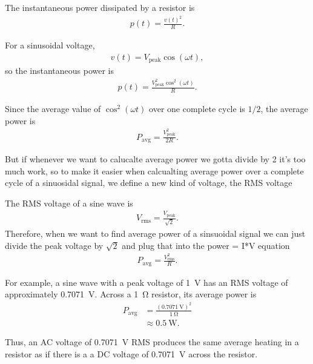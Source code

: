 \documentclass{article}
\begin{document}
    The instantaneous power dissipated by a resistor is
    \begin{align*}
        p(t) = \frac{v(t)^2}{R}.
    \end{align*}

    For a sinusoidal voltage,
    \begin{align*}
        v(t) = V_{\mathrm{peak}}\cos(\omega t),
    \end{align*}
    so the instantaneous power is
    \begin{align*}
        p(t) = \frac{V_{\mathrm{peak}}^2\cos^2(\omega t)}{R}.
    \end{align*}

    Since the average value of $\cos^2(\omega t)$ over one complete cycle
    is $1/2$, the average power is
    \begin{align*}
        P_{\mathrm{avg}} = \frac{V_{\mathrm{peak}}^2}{2R}.
    \end{align*}

    But if whenever we want to calucalte average power we gotta divide by 2 it's too much work, so to make it easier when calcualting average power over a complete cycle of a sinuosidal signal, we define a new kind of voltage, the RMS voltage

    The RMS voltage of a sine wave is
    \begin{align*}
        V_{\mathrm{rms}} = \frac{V_{\mathrm{peak}}}{\sqrt{2}}.
    \end{align*}
    Therefore, when we want to find average power of a sinsuoidal signal we can just divide the peak voltage by $\sqrt{2}$ and plug that into the power = I*V equation
    \begin{align*}
        P_{\mathrm{avg}} = \frac{V_{\mathrm{rms}}^2}{R}.
    \end{align*}

    For example, a sine wave with a peak voltage of \SI{1}{\volt} has an
    RMS voltage of approximately \SI{0.7071}{\volt}. Across a
    \SI{1}{\ohm} resistor, its average power is
    \begin{align*}
        P_{\mathrm{avg}}
        &= \frac{(\SI{0.7071}{\volt})^2}{\SI{1}{\ohm}} \\
        &\approx \SI{0.5}{\watt}.
    \end{align*}

    Thus, an AC voltage of \SI{0.7071}{\volt} RMS produces the same average
    heating in a resistor as if there is a a DC voltage of \SI{0.7071}{\volt} across the resistor.
\end{document}
